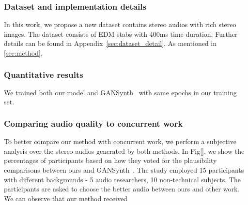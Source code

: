 \subsubsection{Dataset and implementation details}
\label{subsubsec:dataset}
In this work, we propose a new dataset contains stereo audios with rich stereo images. The dataset consists of EDM stabs with 400ms time duration. Further details can be found in Appendix~\ref{sec:dataset_detail}. As mentioned in \ref{sec:method}, 


\subsubsection{Quantitative results}
\label{subsubsec:result}
We trained both our model and GANSynth~\cite{gansynth} with same epochs in our training set. 


\subsubsection{Comparing audio quality to concurrent work}
\label{subsubsec:audio_quality}
To better compare our method with concurrent work, we perform a subjective analysis over the stereo audios generated by both methods. In Fig[], we show the percentages of participants based on how they voted for the plausibility comparisons between ours and GANSynth~\cite{gansynth}. The study employed 15 participants with different backgrounds - 5 audio researchers, 10 non-technical subjects. The participants are asked to choose the better audio between ours and other work. We can observe that our method received 
